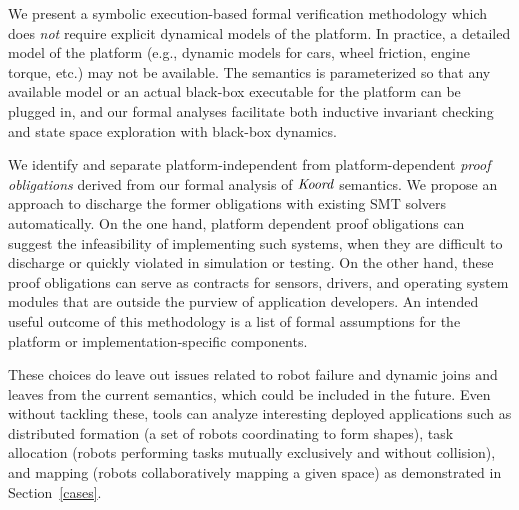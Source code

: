 \begin{noinditem}
\item We present a \K symbolic execution-based formal verification methodology which does {\em not} require explicit dynamical models of the platform.
In practice, a detailed model of the platform (e.g., dynamic models for cars, wheel friction, engine torque, etc.) may not be available.
The \lgname semantics is parameterized so that any available model or an actual black-box executable for the platform can be plugged in,
and our formal analyses facilitate both inductive invariant checking and state space exploration with black-box dynamics.

\item We identify and separate platform-independent from platform-dependent \emph{proof obligations} derived from our formal analysis of $\emph{Koord}$ semantics. We  propose an approach to discharge the former obligations with existing SMT solvers automatically. On the one hand, platform dependent proof obligations can suggest the infeasibility of implementing such systems, when they are difficult to discharge or quickly violated in simulation or testing. On the other hand, these proof obligations can serve as contracts for sensors, drivers, and operating system modules that are outside the purview  of application developers. An intended useful outcome of this methodology is a list of formal assumptions for the platform or implementation-specific components.
\end{noinditem}
%
These choices do leave out issues related to robot failure and dynamic joins and leaves from the current semantics, which could be included in the future. Even without tackling these, \lgname tools can analyze  interesting deployed applications such as distributed formation (a set of robots coordinating to form shapes), task allocation (robots performing tasks mutually exclusively and without collision), and mapping (robots collaboratively mapping  a given space) as demonstrated in Section~\ref{cases}.


